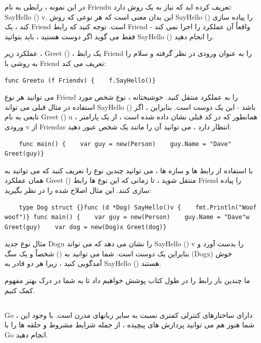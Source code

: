 \documentclass[12pt]{book}
\begin{document}
در این نمونه ، رابطی به نام Friendu تعریف کرده اید که نیاز به یک روش دارد: SayHello () v. این بدان معنی است که هر نوعی که روش SayHello () را پیاده سازی کند ، یک Friend است. توجه کنید که رابط Friend واقعاً آن عملکرد را اجرا نمی کند - فقط می گوید اگر دوست هستید ، باید بتوانید SayHello () را انجام دهید.

عملکرد زیر ، Greet () ، یک رابط Friend را به عنوان ورودی در نظر گرفته و سلام را به روشی با Friend تعریف می کند:
\begin{latin}
	\begin{lstlisting}
func Greetu (f Friendv) {    f.SayHello()}
	\end{lstlisting}
\end{latin}

می توانید هر نوع Friend را به عملکرد منتقل کنید. خوشبختانه ، نوع شخص مورد استفاده در مثال قبلی می تواند SayHello () باشد - این یک دوست است. بنابراین ، اگر تابعی به نام Greet () u ، همانطور که در کد قبلی نشان داده شده است ، از یک پارامتر ورودی v از Friendas انتظار دارد ، می توانید آن را مانند یک شخص عبور دهید:
\begin{latin}
	\begin{lstlisting}
	func main() {    var guy = new(Person)    guy.Name = "Dave"    Greet(guy)}
	\end{lstlisting}
\end{latin}

با استفاده از رابط ها و سازه ها ، می توانید چندین نوع را تعریف کنید که می توانید به همان عملکرد Greet () منتقل شوید ، تا زمانی که این نوع ها رابط Friend را پیاده سازی کنند. این مثال اصلاح شده را در نظر بگیرید:
\begin{latin}
	\begin{lstlisting}
	type Dog struct {}func (d *Dog) SayHello()v {    fmt.Println("Woof woof")} func main() {    var guy = new(Person)    guy.Name = "Dave"w Greet(guy)    var dog = new(Dog)x Greet(dog)}
	\end{lstlisting}
\end{latin}

مثال نوع جدید Dogu را نشان می دهد که می تواند SayHello () v را بدست آورد و بنابراین یک دوست است. شما می توانید به () شخصاً و یک سگ (Dogx) خوش آمدگویی کنید ، زیرا هر دو قادر به SayHello () هستند.

ما چندین بار رابط را در طول کتاب پوشش خواهیم داد تا به شما در درک بهتر مفهوم کمک کنیم.
\subsection{}
Go دارای ساختارهای کنترلی کمتری نسبت به سایر زبانهای مدرن است. با وجود این ، شما هنوز هم می توانید پردازش های پیچیده ، از جمله شرایط مشروط و حلقه ها را با Go انجام دهید.
\end{document}

